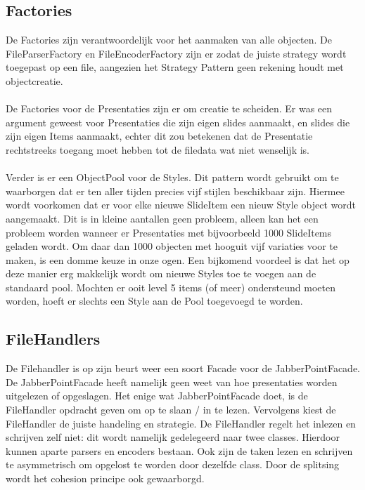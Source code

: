 \documentclass[a4paper]{article}
\newcommand{\1}[0]{\'{e}\'{e}n}
\begin{document}
\subsection{Factories}
\label{sub:factories}
De Factories zijn verantwoordelijk voor het aanmaken van alle objecten. De
FileParserFactory en FileEncoderFactory zijn er zodat de juiste strategy wordt
toegepast op een file, aangezien het Strategy Pattern geen rekening houdt met
objectcreatie.
\\\\
De Factories voor de Presentaties zijn er om creatie te scheiden. Er was een
argument geweest voor Presentaties die zijn eigen slides aanmaakt, en slides
die zijn eigen Items aanmaakt, echter dit zou betekenen dat de Presentatie
rechtstreeks toegang moet hebben tot de filedata wat niet wenselijk is.
\\\\
Verder is er een ObjectPool voor de Styles. Dit pattern wordt gebruikt om te
waarborgen dat er ten aller tijden precies vijf stijlen beschikbaar zijn. Hiermee wordt voorkomen dat er voor elke nieuwe SlideItem een nieuw Style object wordt aangemaakt. Dit is in kleine aantallen geen probleem, alleen kan het een probleem worden wanneer er Presentaties met bijvoorbeeld 1000 SlideItems geladen wordt. Om daar dan 1000 objecten met hooguit vijf variaties voor te maken, is een domme keuze in onze ogen. Een bijkomend voordeel is dat het op deze manier erg makkelijk wordt om nieuwe Styles toe te voegen aan de standaard pool. Mochten er ooit level 5 items (of meer) ondersteund moeten worden, hoeft er slechts een Style aan de Pool toegevoegd te worden.

\subsection{FileHandlers}
De Filehandler is op zijn beurt weer een soort Facade voor de JabberPointFacade.
De JabberPointFacade heeft namelijk geen weet van hoe presentaties worden uitgelezen of
opgeslagen. Het enige wat JabberPointFacade doet, is de FileHandler opdracht geven om op te slaan / in te lezen. Vervolgens kiest de FileHandler de juiste handeling en strategie. De FileHandler regelt het inlezen en schrijven zelf niet: dit wordt namelijk gedelegeerd naar twee classes. Hierdoor kunnen aparte parsers en encoders bestaan. Ook zijn de taken lezen en schrijven te asymmetrisch om opgelost te worden door dezelfde class. Door de splitsing wordt het cohesion principe ook gewaarborgd.
\end{document}

